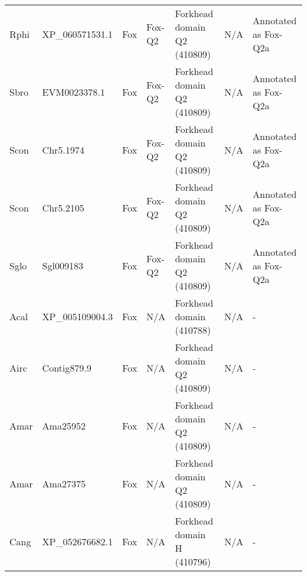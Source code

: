 \documentclass[../main.tex]{subfiles}
\begin{document}
\begin{landscape}
\begin{longtable}{lllllll}
		Rphi           & XP\_060571531.1       & Fox            & Fox-Q2              & Forkhead domain Q2 (410809)                 & N/A                                                                    & Annotated as Fox-Q2a \\
		Sbro           & EVM0023378.1          & Fox            & Fox-Q2              & Forkhead domain Q2 (410809)                 & N/A                                                                    & Annotated as Fox-Q2a \\
		Scon           & Chr5.1974             & Fox            & Fox-Q2              & Forkhead domain Q2 (410809)                 & N/A                                                                    & Annotated as Fox-Q2a \\
		Scon           & Chr5.2105             & Fox            & Fox-Q2              & Forkhead domain Q2 (410809)                 & N/A                                                                    & Annotated as Fox-Q2a \\
		Sglo           & Sgl009183             & Fox            & Fox-Q2              & Forkhead domain Q2 (410809)                 & N/A                                                                    & Annotated as Fox-Q2a \\
		Acal           & XP\_005109004.3       & Fox            & N/A                 & Forkhead domain (410788)                    & N/A                                                                    & -                    \\
		Airc           & Contig879.9           & Fox            & N/A                 & Forkhead domain Q2 (410809)                 & N/A                                                                    & -                    \\
		Amar           & Ama25952              & Fox            & N/A                 & Forkhead domain Q2 (410809)                 & N/A                                                                    & -                    \\
		Amar           & Ama27375              & Fox            & N/A                 & Forkhead domain Q2 (410809)                 & N/A                                                                    & -                    \\
		Cang           & XP\_052676682.1       & Fox            & N/A                 & Forkhead domain H (410796)                  & N/A                                                                    & -                    \\

\end{longtable}
\end{landscape}
\end{document}
